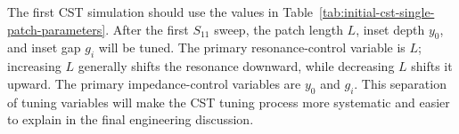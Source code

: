 The first CST simulation should use the values in Table~\ref{tab:initial-cst-single-patch-parameters}.
After the first \(S_{11}\) sweep, the patch length \(L\), inset depth \(y_0\), and inset gap \(g_i\)
will be tuned. The primary resonance-control variable is \(L\); increasing \(L\) generally shifts the
resonance downward, while decreasing \(L\) shifts it upward. The primary impedance-control
variables are \(y_0\) and \(g_i\). This separation of tuning variables will make the CST tuning process
more systematic and easier to explain in the final engineering discussion.
